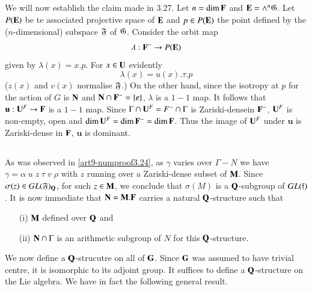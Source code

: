 \subsection{}\label{art9-subsec3.29}
We will now establish the claim made in 3.27. Let $n = \dim\mathbf{F}$ and $\mathbf{E} = \wedge^n \mathfrak{G}$. Let $P(\mathbf{E})$ be te associated projective space of $\mathbf{E}$ and $p \in P (\mathbf{E})$ the point defined by the ($n$-dimensional) subspace $\mathfrak{F}$ of $\mathfrak{G}$. Consider the orbit map
$$
\lambda : \mathbf{F}^- \to P (\mathbf{E})
$$
given by $\lambda(x) = x. p$. For $x \in \mathbf{U}$ evidently
$$
\lambda (x) = u (x). \tau . p
$$
($z(x)$ and $v(x)$ normalise $\mathfrak{F}$.) On the other hand, since the isotropy at $p$ for the action of $G$ is $\mathbf{N}$ and $\mathbf{N} \cap \mathbf{F}^- =\{e\}$, $\lambda$ is a $1-1$ map. It follows that $\textbf{u}: \mathbf{U}^F \to \mathbf{F}$ is a $1-1$ map. Since $\Gamma \cap \mathbf{U}^F = F^- \cap \Gamma$ is Zariski-dense\pageoriginale  in $\mathbf{F}^-$, $\mathbf{U}^F$ is non-empty, open and $\dim \mathbf{U}^F = \dim \mathbf{F}^- = \dim \mathbf{F}$. Thus the image of $\mathbf{U}^F$ under $\textbf{u}$ is Zariski-dense in $\mathbf{F}$, \ie $\textbf{u}$ is dominant.

\subsection{}\label{art9-subsec3.30}
As was observed in \ref{art9-numproof3.24}, as $\gamma$ varies over $\Gamma - N$ we have $\gamma = \alpha \;u \;z \;\tau\; v \;\rho$ with $z$ running over a Zariski-dense subset of $\mathbf{M}$. Since $\sigma (z) \in G L (\mathfrak{F})_{\mathbf{Q}}$, for such $z \in \mathbf{M}$, we conclude that $\sigma (M)$ is a $\mathbf{Q}$-subgroup of $GL (\mathfrak{f})$. It is now immediate that $\mathbf{N} = \mathbf{M} . \mathbf{F}$ carries a natural $\mathbf{Q}$-structure such that 
\begin{itemize}
\item[(i)] $\mathbf{M}$ defined over $\mathbf{Q}$
and 
\item[(ii)] $\mathbf{N} \cap \Gamma$ is an arithmetic subgroup of $N$ for this $\mathbf{Q}$-structure. 
\end{itemize}
We now define a $\mathbf{Q}$-strucutre on all of $\mathbf{G}$. Since $\mathbf{G}$ was assumed to have trivial centre, it is isomorphic to its adjoint group. It suffices to define a $\mathbf{Q}$-structure on the Lie algebra. We have in fact the following general result.

